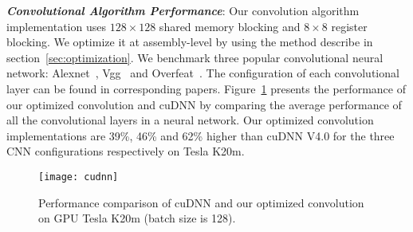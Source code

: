 {\em {\bf Convolutional Algorithm Performance}}:
Our convolution algorithm implementation uses $128\times128$ shared memory blocking and
$8\times8$ register blocking. We optimize it at assembly-level by using the method describe in section~\ref{sec:optimization}.
We benchmark three popular convolutional neural network:
Alexnet~\cite{krizhevsky2012imagenet}, Vgg~\cite{simonyan2014very} and
Overfeat~\cite{sermanet2013overfeat}.  The configuration of each convolutional
layer can be found in corresponding papers.
Figure~\ref{fig:conv} presents the performance of our optimized convolution and cuDNN by comparing the average performance of all the convolutional layers in a neural network. %
Our optimized convolution implementations are 39\%, 46\% and 62\% higher than cuDNN V4.0 for the three CNN configurations respectively on Tesla K20m.

\begin{figure}[htbp]
\begin{center}
\texttt{[image: cudnn]}
    \caption{Performance comparison of cuDNN and our optimized convolution on GPU Tesla K20m (batch size is 128).}
\label{fig:conv}
\end{center}
\end{figure}
